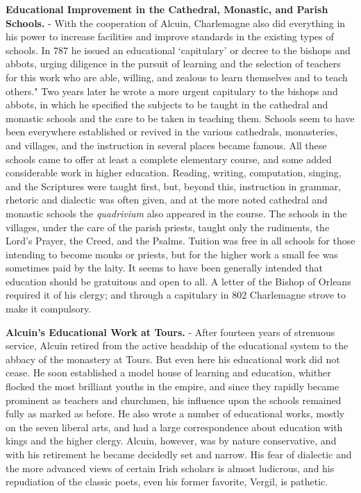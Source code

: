 \documentclass[
]{book}
\begin{document}
\textbf{Educational Improvement in the Cathedral, Monastic, and Parish Schools.} - With the cooperation of Alcuin, Charlemagne also did everything in his power to increase facilities and improve standards in the existing types of schools. In 787 he issued an educational `capitulary' or decree to the bishops and abbots, urging diligence in the pursuit of learning and the selection of teachers for this work who are able, willing, and zealous to learn themselves and to teach others." Two years later he wrote a more urgent capitulary to the bishops and abbots, in which he specified the subjects to be taught in the cathedral and monastic schools and the care to be taken in teaching them. Schools seem to have been everywhere established or revived in the various cathedrals, monasteries, and villages, and the instruction in several places became famous. All these schools came to offer at least a complete elementary course, and some added considerable work in higher education. Reading, writing, computation, singing, and the Scriptures were taught first, but, beyond this, instruction in grammar, rhetoric and dialectic was often given, and at the more noted cathedral and monastic schools the \emph{quadrivium} also appeared in the course. The schools in the villages, under the care of the parish priests, taught only the rudiments, the Lord's Prayer, the Creed, and the Psalms. Tuition was free in all schools for those intending to become monks or priests, but for the higher work a small fee was sometimes paid by the laity. It seems to have been generally intended that education should be gratuitous and open to all. A letter of the Bishop of Orleans required it of his clergy; and through a capitulary in 802 Charlemagne strove to make it compulsory.

\textbf{Alcuin's Educational Work at Tours.} - After fourteen years of strenuous service, Alcuin retired from the active headship of the educational system to the abbacy of the monastery at Tours. But even here his educational work did not cease. He soon established a model house of learning and education, whither flocked the most brilliant youths in the empire, and since they rapidly became prominent as teachers and churchmen, his influence upon the schools remained fully as marked as before. He also wrote a number of educational works, mostly on the seven liberal arts, and had a large correspondence about education with kings and the higher clergy. Alcuin, however, was by nature conservative, and with his retirement he became decidedly set and narrow. His fear of dialectic and the more advanced views of certain Irish scholars is almost ludicrous, and his repudiation of the classic poets, even his former favorite, Vergil, is pathetic.
\end{document}
